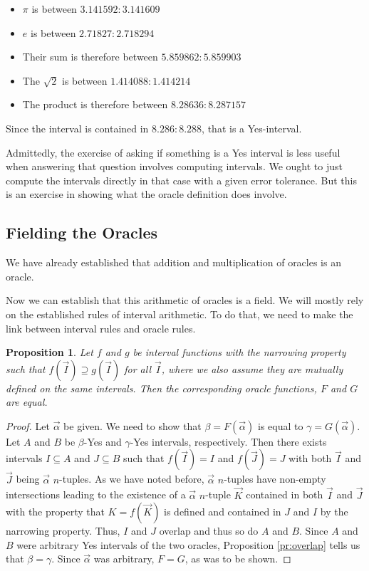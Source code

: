 \documentclass[12pt]{article}
\newtheorem{proposition}{Proposition}
\theoremstyle{remark}
\begin{document}
\begin{itemize}
    \item $\pi$ is between $3.141592:3.141609$
    \item $e$ is between $2.71827:2.718294$
    \item Their sum is therefore between $5.859862:5.859903$
    \item The $\sqrt{2}$ is between $1.414088:1.414214$
    \item The product is therefore between $8.28636:8.287157$
\end{itemize}

Since the interval is contained in $8.286:8.288$, that is a Yes-interval. 

Admittedly, the exercise of asking if something is a Yes interval is less useful when answering that question involves computing intervals. We ought to just compute the intervals directly in that case with a given error tolerance. But this is an exercise in showing what the oracle definition does involve.


\subsection{Fielding the Oracles}

We have already established that addition and multiplication of oracles is an oracle. 


Now we can establish that this arithmetic of oracles is a field. We will mostly rely on the established rules of interval arithmetic. To do that, we need to make the link between interval rules and oracle rules. 


\begin{proposition}
Let $f$ and $g$ be interval functions with the narrowing property such that $f(\vec{I}) \supseteq g(\vec{I})$ for all $\vec{I}$, where we also assume they are mutually defined on the same intervals. Then the corresponding oracle functions, $F$ and $G$ are equal.  
\end{proposition}

\begin{proof}
Let $\vec{\alpha}$ be given. We need to show that $\beta = F(\vec{\alpha})$ is equal to $\gamma =  G(\vec{\alpha})$. Let $A$ and $B$ be $\beta$-Yes and $\gamma$-Yes intervals, respectively. Then there exists intervals $I \subseteq A$ and  $J \subseteq B$  such that $f(\vec{I}) = I$ and $f(\vec{J}) = J$ with both  $\vec{I}$ and $\vec{J}$ being $\vec{\alpha}$ $n$-tuples. As we have noted before, $\vec{\alpha}$ $n$-tuples have non-empty intersections leading to the existence of a $\vec{\alpha}$ $n$-tuple $\vec{K}$ contained in both $\vec{I}$ and $\vec{J}$ with the property that $K = f(\vec{K})$ is defined and contained in $J$ and $I$ by the narrowing property. Thus, $I$ and $J$ overlap and thus so do $A$ and $B$. Since $A$ and $B$ were arbitrary Yes intervals of the two oracles, Proposition \ref{pr:overlap} tells us that $\beta = \gamma$. Since $\vec{\alpha}$ was arbitrary, $F = G$, as was to be shown.
\end{proof}
\end{document}
